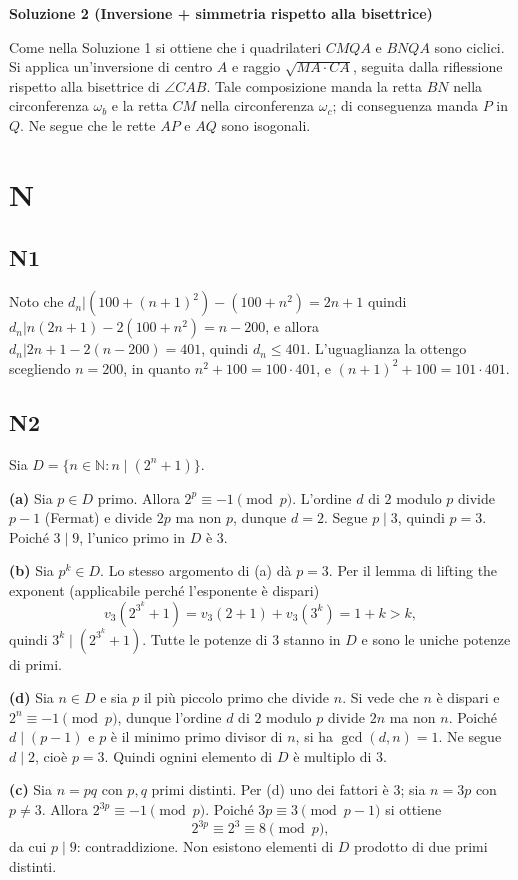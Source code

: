 \documentclass[11pt]{scrartcl}
\begin{document}
\textbf{Soluzione 2 (Inversione + simmetria rispetto alla bisettrice)}

Come nella Soluzione 1 si ottiene che i quadrilateri $CMQA$ e $BNQA$ sono ciclici.
Si applica un’inversione di centro $A$ e raggio $\sqrt{MA\cdot CA}$,
seguita dalla riflessione rispetto alla bisettrice di $\angle CAB$.
Tale composizione manda la retta $BN$ nella circonferenza $\omega_b$
e la retta $CM$ nella circonferenza $\omega_c$; di conseguenza manda $P$ in $Q$.
Ne segue che le rette $AP$ e $AQ$ sono isogonali.
\section{N}

\subsection{N1}
Noto che $d_n | (100+(n+1)^2)-(100+ n^2)=2n+1$ quindi $d_n| n(2n+1)-2(100+n^2)=
n-200$, e allora $d_n| 2n+1-2(n-200)=401$, quindi $d_n\le 401$. L'uguaglianza la
ottengo scegliendo $n=200$, in quanto $n^2+100 = 100 \cdot 401$, e $(n+1)^2+100 = 101 \cdot
401$.

\subsection{N2}
Sia $D=\{n\in\mathbb{N}:n\mid(2^n+1)\}$.

\textbf{(a)} Sia $p\in D$ primo. Allora $2^p\equiv-1\pmod{p}$. L’ordine $d$ di $2$
modulo $p$ divide $p-1$ (Fermat) e divide $2p$ ma non $p$, dunque $d=2$.
Segue $p\mid3$, quindi $p=3$. Poiché $3\mid9$, l’unico primo in $D$ è $3$.

\textbf{(b)} Sia $p^k\in D$. Lo stesso argomento di (a) dà $p=3$. Per il
lemma di lifting the exponent (applicabile perché l’esponente è dispari)
\[
v_3(2^{3^k}+1)=v_3(2+1)+v_3(3^k)=1+k>k,
\]
quindi $3^k\mid(2^{3^k}+1)$. Tutte le potenze di $3$ stanno in $D$ e
sono le uniche potenze di primi.

\textbf{(d)} Sia $n\in D$ e sia $p$ il più piccolo primo che divide $n$.
Si vede che $n$ è dispari e $2^n\equiv-1\pmod{p}$, dunque l’ordine $d$ di $2$ modulo
$p$ divide $2n$ ma non $n$. Poiché $d\mid(p-1)$ e $p$ è il minimo primo divisor di $n$,
si ha $\gcd(d,n)=1$. Ne segue $d\mid2$, cioè $p=3$. Quindi ognini elemento di $D$ è multiplo di $3$.

\textbf{(c)} Sia $n=pq$ con $p,q$ primi distinti. Per (d) uno dei fattori è $3$;
sia $n=3p$ con $p\neq3$. Allora $2^{3p}\equiv-1\pmod{p}$. Poiché $3p\equiv3\pmod{p-1}$
si ottiene
\[
2^{3p}\equiv2^3\equiv8\pmod{p},
\]
da cui $p\mid9$: contraddizione. Non esistono elementi di $D$ prodotto di due primi distinti.
\end{document}
